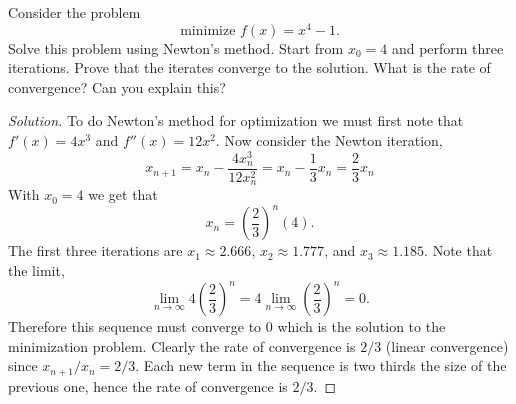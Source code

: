 \documentclass[12pt]{article}
\makeatletter
\theoremstyle{homework}
\newenvironment{exercise}[1]
{\def\@currentlabel{#1}\exercisecore}
{\endexercisecore}
\makeatother
\begin{document}
\begin{exercise}{3.4} Consider the problem
  \begin{equation*}
    \text{minimize } f(x) = x^4 - 1.
  \end{equation*}
  Solve this problem using Newton's method. Start from $x_0 = 4$ and perform three iterations. Prove that the 
  iterates converge to the solution. What is the rate of convergence? Can you explain this?
    \begin{proof}[Solution] To do Newton's method for optimization we must first note that $f'(x) = 4x^3$ and
      $f''(x) = 12x^2$. Now consider the Newton iteration, 
      \begin{equation*}
        x_{n+1} = x_n - \frac{4x_n^3}{12x_n^2} = x_n - \frac{1}{3}x_n = \frac{2}{3}x_n
      \end{equation*} 
      With $x_0 = 4$ we get that 
      \begin{equation*}
      x_n = \left(\frac{2}{3}\right)^n(4).
      \end{equation*}
      The first three iterations are $x_1 \approx 2.666$, $x_2 \approx 1.777$, and $x_3 \approx 1.185$. 
      Note that the limit, 
      \begin{equation*}
        \lim_{n \to \infty} 4\left(\frac{2}{3}\right)^n = 4\lim_{n \to \infty} \left(\frac{2}{3}\right)^n = 0.
      \end{equation*}
      Therefore this sequence must converge to 0 which is the solution to the minimization problem. 
      Clearly the rate of convergence is $2/3$ (linear convergence) since $x_{n+1}/x_n = 2/3$. Each new term in the sequence is two thirds the size of the 
      previous one, hence the rate of convergence is $2/3$.
      \end{proof}
\end{exercise}
\vspace{.5in}
\end{document}
